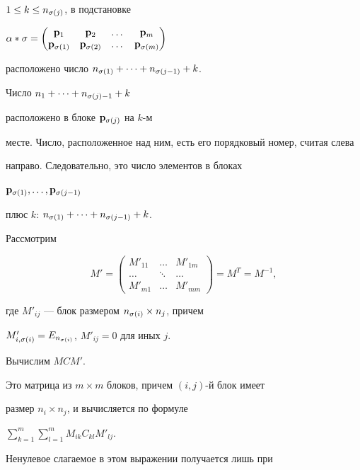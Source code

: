 \begin{pf}
$1\leq k \leq n_{\sigma (j)}$, в подстановке


$\al * \s =


\begin{pmatrix}


{\bold p}_1 & {\bold p}_2 & \dotsc & {\bold p}_m\\


{\bold p}_{\s (1)} & {\bold p}_{\s (2)} & \dotsc & {\bold p}_{\s (m)}


\end{pmatrix}


$


расположено число $n_{\sigma (1)}+\dotsb +n_{\sigma (j-1)}+k$.


Число $n_1+\dotsb +n_{\sigma (j)-1}+k$ 


расположено в блоке ${\bold p}_{\sigma (j)}$ на $k$-м


месте. Число, расположенное над ним, есть его порядковый номер, считая слева


направо. Следовательно, это число элементов в блоках


${\bold p}_{\sigma (1)},\dotsc ,{\bold p}_{\sigma (j-1)}$


плюс $k$: $n_{\sigma (1)}+\dotsb +n_{\sigma (j-1)}+k$.


Рассмотрим


$$


M'=


\begin{pmatrix}


M'_{11} & \dotsc & M'_{1m} \\


\dotsc & \ddots & \dotsc \\


M'_{m1} & \dotsc & M'_{mm} 


\end{pmatrix}


=M^T=M^{-1},


$$


где $M'_{ij}$ --- блок размером $n_{\sigma (i)}\times n_j$, причем


$M'_{i,\sigma (i)}=E_{n_{\sigma (i)}}$, $M'_{ij}=0$ для иных $j$.


Вычислим $MCM'$.


Это матрица из $m\times m$ блоков, причем $(i,j)$-й блок имеет


размер $n_i\times n_j$, и вычисляется по формуле


$\sum\limits_{k=1}^m \sum\limits_{l=1}^m M_{ik}C_{kl}M'_{lj}$.


Ненулевое слагаемое в этом выражении получается лишь при



\end{pf}

